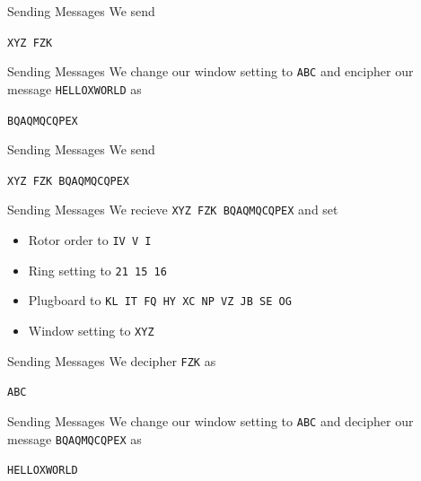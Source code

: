 \documentclass[hyphens,aspectratio=169]{beamer}
\begin{document}
\begin{frame}{Sending Messages}
We send
    \begin{center}
        \texttt{XYZ FZK}
    \end{center}
\end{frame}

\begin{frame}{Sending Messages}
We change our window setting to \texttt{ABC} and encipher our message \texttt{HELLOXWORLD} as
    \begin{center}
        \texttt{BQAQMQCQPEX}
    \end{center}
\end{frame}

\begin{frame}{Sending Messages}
We send
    \begin{center}
        \texttt{XYZ FZK BQAQMQCQPEX}
    \end{center}
\end{frame}

\begin{frame}{Sending Messages}
    We recieve \texttt{XYZ FZK BQAQMQCQPEX} and set
    \begin{itemize}
        \item Rotor order to \texttt{IV V I}
        \item Ring setting to \texttt{21 15 16}
        \item Plugboard to \texttt{KL IT FQ HY XC NP VZ JB SE OG}
        \item Window setting to \texttt{XYZ}
    \end{itemize}
\end{frame}

\begin{frame}{Sending Messages}
We decipher \texttt{FZK} as
    \begin{center}
        \texttt{ABC}
    \end{center}
\end{frame}

\begin{frame}{Sending Messages}
We change our window setting to \texttt{ABC} and decipher our message \texttt{BQAQMQCQPEX} as
    \begin{center}
        \texttt{HELLOXWORLD}
    \end{center}
\end{frame}

\end{document}
